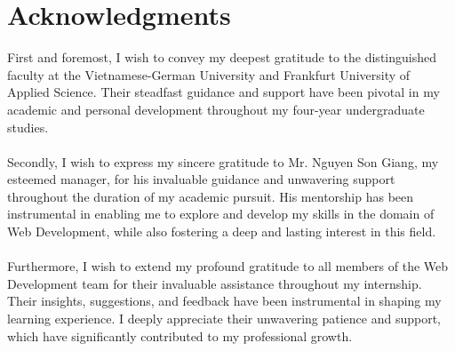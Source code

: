 \section{Acknowledgments}


First and foremost, I wish to convey my deepest gratitude to the distinguished faculty at the Vietnamese-German University and Frankfurt University of Applied Science. Their steadfast guidance and support have been pivotal in my academic and personal development throughout my four-year undergraduate studies. \\ \\
Secondly, I wish to express my sincere gratitude to Mr. Nguyen Son Giang, my esteemed manager, for his invaluable guidance and unwavering support throughout the duration of my academic pursuit. His mentorship has been instrumental in enabling me to explore and develop my skills in the domain of Web Development, while also fostering a deep and lasting interest in this field. \\ \\
Furthermore, I wish to extend my profound gratitude to all members of the Web Development team for their invaluable assistance throughout my internship. Their insights, suggestions, and feedback have been instrumental in shaping my learning experience. I deeply appreciate their unwavering patience and support, which have significantly contributed to my professional growth.